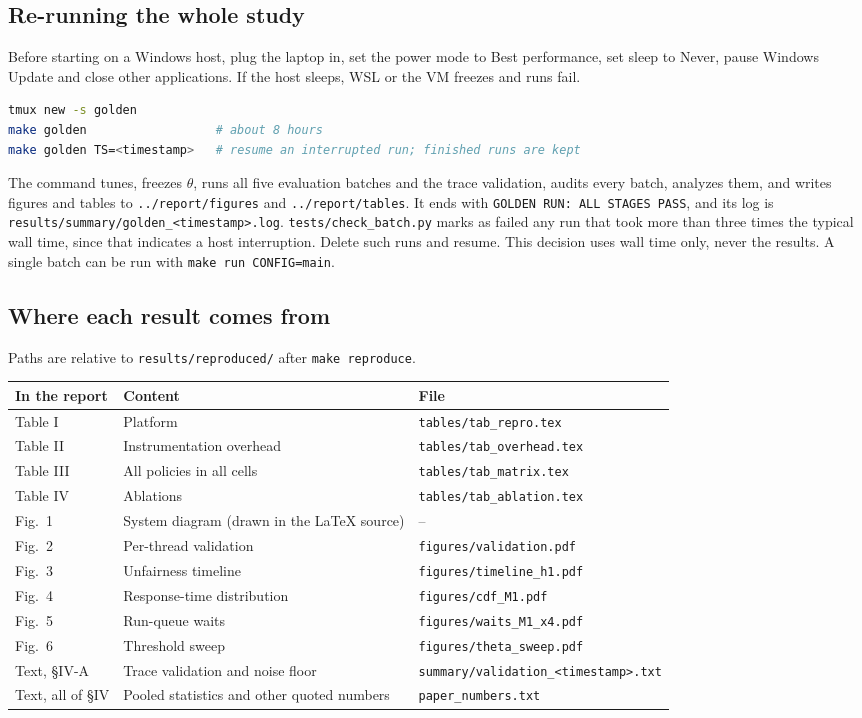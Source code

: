 \documentclass[10.5pt,a4paper]{article}
\newcommand{\f}[1]{\texttt{#1}}
\begin{document}
\subsection{Re-running the whole study}\label{sec:full}
Before starting on a Windows host, plug the laptop in, set the power mode to Best performance, set sleep to Never, pause Windows Update and close other applications. If the host sleeps, WSL or the VM freezes and runs fail.
\begin{lstlisting}[language=bash]
tmux new -s golden
make golden                  # about 8 hours
make golden TS=<timestamp>   # resume an interrupted run; finished runs are kept
\end{lstlisting}
The command tunes, freezes $\theta$, runs all five evaluation batches and the trace validation, audits every batch, analyzes them, and writes figures and tables to \f{../report/figures} and \f{../report/tables}. It ends with \f{GOLDEN RUN: ALL STAGES PASS}, and its log is \f{results/summary/golden\_<timestamp>.log}. \f{tests/check\_batch.py} marks as failed any run that took more than three times the typical wall time, since that indicates a host interruption. Delete such runs and resume. This decision uses wall time only, never the results. A single batch can be run with \f{make run CONFIG=main}.

\subsection{Where each result comes from}
Paths are relative to \f{results/reproduced/} after \f{make reproduce}.

\begin{center}
\begin{tabularx}{\textwidth}{@{}lLl@{}}
\toprule
\textbf{In the report} & \textbf{Content} & \textbf{File} \\
\midrule
Table I & Platform & \f{tables/tab\_repro.tex} \\
Table II & Instrumentation overhead & \f{tables/tab\_overhead.tex} \\
Table III & All policies in all cells & \f{tables/tab\_matrix.tex} \\
Table IV & Ablations & \f{tables/tab\_ablation.tex} \\
Fig.~1 & System diagram (drawn in the LaTeX source) & -- \\
Fig.~2 & Per-thread validation & \f{figures/validation.pdf} \\
Fig.~3 & Unfairness timeline & \f{figures/timeline\_h1.pdf} \\
Fig.~4 & Response-time distribution & \f{figures/cdf\_M1.pdf} \\
Fig.~5 & Run-queue waits & \f{figures/waits\_M1\_x4.pdf} \\
Fig.~6 & Threshold sweep & \f{figures/theta\_sweep.pdf} \\
Text, \S IV-A & Trace validation and noise floor & \f{summary/validation\_<timestamp>.txt} \\
Text, all of \S IV & Pooled statistics and other quoted numbers & \f{paper\_numbers.txt} \\
\bottomrule
\end{tabularx}
\end{center}
\end{document}
